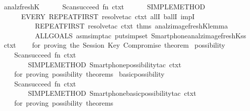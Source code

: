 \begin{isabellebody}
  \endisadelimML
  \isatagML
  \isamarkupfalse%
  \ analz{\isacharunderscore}freshK\ {\isacharequal}\ {\isacartoucheopen}\isanewline
  \ \ \ \ Scan{\isachardot}succeed\ {\isacharparenleft}fn\ ctxt\ {\isacharequal}{\isachargreater}\isanewline
  \ \ \ \ \ {\isacharparenleft}SIMPLE{\isacharunderscore}METHOD\isanewline
  \ \ \ \ \ \ {\isacharparenleft}EVERY\ {\isacharbrackleft}REPEAT{\isacharunderscore}FIRST\ {\isacharparenleft}resolve{\isacharunderscore}tac\ ctxt\ {\isacharbrackleft}allI{\isacharcomma}\ ballI{\isacharcomma}\ impI{\isacharbrackright}{\isacharparenright}{\isacharcomma}\isanewline
  \ \ \ \ \ \ \ \ \ \ REPEAT{\isacharunderscore}FIRST\ {\isacharparenleft}resolve{\isacharunderscore}tac\ ctxt\ {\isacharat}{\isacharbraceleft}thms\ analz{\isacharunderscore}image{\isacharunderscore}freshK{\isacharunderscore}lemma{\isacharbraceright}{\isacharparenright}{\isacharcomma}\isanewline
  \ \ \ \ \ \ \ \ \ \ ALLGOALS\ {\isacharparenleft}asm{\isacharunderscore}simp{\isacharunderscore}tac\ {\isacharparenleft}put{\isacharunderscore}simpset\ Smartphone{\isachardot}analz{\isacharunderscore}image{\isacharunderscore}freshK{\isacharunderscore}ss\ ctxt{\isacharparenright}{\isacharparenright}{\isacharbrackright}{\isacharparenright}{\isacharparenright}{\isacharparenright}{\isacartoucheclose}\isanewline
  \ \ \ \ {\isachardoublequoteopen}for\ proving\ the\ Session\ Key\ Compromise\ theorem{\isachardoublequoteclose}\isanewline
  \isanewline
  \isamarkupfalse%
  \ possibility\ {\isacharequal}\ {\isacartoucheopen}\isanewline
  \ \ \ \ Scan{\isachardot}succeed\ {\isacharparenleft}fn\ ctxt\ {\isacharequal}{\isachargreater}\isanewline
  \ \ \ \ \ \ \ \ SIMPLE{\isacharunderscore}METHOD\ {\isacharparenleft}Smartphone{\isachardot}possibility{\isacharunderscore}tac\ ctxt{\isacharparenright}{\isacharparenright}{\isacartoucheclose}\isanewline
  \ \ \ \ {\isachardoublequoteopen}for\ proving\ possibility\ theorems{\isachardoublequoteclose}\isanewline
  \isanewline
  \isamarkupfalse%
  \ basic{\isacharunderscore}possibility\ {\isacharequal}\ {\isacartoucheopen}\isanewline
  \ \ \ \ Scan{\isachardot}succeed\ {\isacharparenleft}fn\ ctxt\ {\isacharequal}{\isachargreater}\isanewline
  \ \ \ \ \ \ \ \ SIMPLE{\isacharunderscore}METHOD\ {\isacharparenleft}Smartphone{\isachardot}basic{\isacharunderscore}possibility{\isacharunderscore}tac\ ctxt{\isacharparenright}{\isacharparenright}{\isacartoucheclose}\isanewline
  \ \ \ \ {\isachardoublequoteopen}for\ proving\ possibility\ theorems{\isachardoublequoteclose}%

\end{isabellebody}
